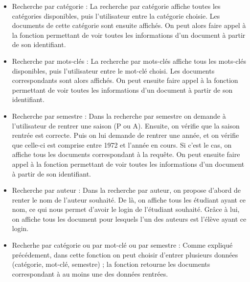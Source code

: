 \documentclass[11pt]{report}
\begin{document}
\begin{itemize}
\item Recherche par catégorie : La recherche par catégorie affiche toutes les catégories disponibles, puis l'utilisateur entre la catégorie choisie. Les documents de cette catégorie sont ensuite affichés. On peut alors faire appel à la fonction permettant de voir toutes les informations d'un document à partir de son identifiant. 

\item Recherche par mots-clés : La recherche par mots-clés affiche tous les mots-clés disponibles, puis l'utilisateur entre le mot-clé choisi. Les documents correspondants sont alors affichés. On peut ensuite faire appel à la fonction permettant de voir toutes les informations d'un document à partir de son identifiant. 

\item Recherche par semestre : Dans la recherche par semestre on demande à l'utilisateur de rentrer une saison (P ou A). Ensuite, on vérifie que la saison rentrée est correcte. Puis on lui demande de rentrer une année, et on vérifie que celle-ci est comprise entre 1972 et l'année en cours. Si c'est le cas, on affiche tous les documents correspondant à la requête. On peut ensuite faire appel à la fonction permettant de voir toutes les informations d'un document à partir de son identifiant.  

\item Recherche par auteur : Dans la recherche par auteur, on propose d'abord de renter le nom de l'auteur souhaité. De là, on affiche tous les étudiant ayant ce nom, ce qui nous permet d'avoir le login de l'étudiant souhaité. Grâce à lui, on affiche tous les document pour lesquels l'un des auteurs est l'élève ayant ce login.

\item Recherhe par catégorie ou par mot-clé ou par semestre : Comme expliqué précédement, dans cette fonction on peut choisir d'entrer plusieurs données (catégorie, mot-clé, semestre) ; la fonction retourne les documents correspondant à au moins une des données rentrées.
\end{itemize}
\end{document}
